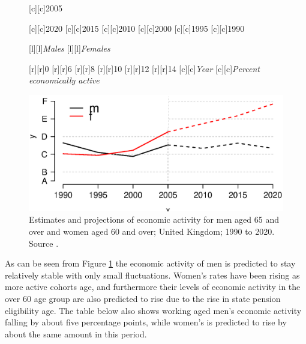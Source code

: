\documentclass[11 pt, a4paper]{report}
\begin{document}
\begin{figure}[hbtp!]


[c][c]{\small{2005}}

[c][c]{\small{2020}}
[c][c]{\small{2015}}
[c][c]{\small{2010}}
[c][c]{\small{2000}}
[c][c]{\small{1995}}
[c][c]{\small{1990}}

[l][l]{\small{\emph{Males}}}
[l][l]{\small{\emph{Females}}}

[r][r]{\small{0}}
[r][r]{\small{6}}
[r][r]{\small{8}}
[r][r]{\small{10}}
[r][r]{\small{12}}
[r][r]{\small{14}}
[c][c]{\small{\emph{Year}}}
[c][c]{\small{\emph{Percent economically active}}}

\includegraphics[width=\textwidth]{../figures/Fig5.7.eps}
\caption{Estimates and projections of economic activity for men aged 65 and over and women aged 60 and over; United Kingdom; 1990 to 2020. Source \citet{Mad2006}.}
\label{Fig:57}
\end{figure}

As can be seen from Figure \ref{Fig:57} the economic activity of men is predicted to stay relatively stable with only small fluctuations. Women's rates have been rising as more active cohorts age, and furthermore their levels of economic activity in the over 60 age group are also predicted to rise due to the rise in state pension eligibility age. The table below also shows working aged men's economic activity falling by about five percentage points, while women's is predicted to rise by about the same amount in this period. 
\end{document}
